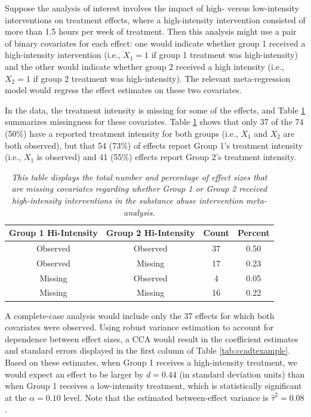 \documentclass[
]{article}
\begin{document}
Suppose the analysis of interest involves the impact of high- versus low-intensity interventions on treatment effects, where a high-intensity intervention consisted of more than 1.5 hours per week of treatment.
Then this analysis might use a pair of binary covariates for each effect: one would indicate whether group 1 received a high-intensity intervention (i.e., \(X_1 = 1\) if group 1 treatment was high-intensity) and the other would indicate whether group 2 received a high intensity (i.e., \(X_{2} = 1\) if group 2 treatment was high-intensity).
The relevant meta-regression model would regress the effect estimates on these two covariates.

In the data, the treatment intensity is missing for some of the effects, and Table \ref{tab:misspat} summarizes missingness for these covariates.
Table \ref{tab:misspat} shows that only 37 of the 74 (50\%) have a reported treatment intensity for both groups (i.e., \(X_{1}\) and \(X_{2}\) are both observed), but that 54 (73\%) of effects report Group 1's treatment intensity (i.e., \(X_{1}\) is observed) and 41 (55\%) effects report Group 2's treatment intensity.

\begin{table}

\caption{\label{tab:unnamed-chunk-2}\label{tab:misspat} \textit{This table displays the total number and percentage of effect sizes that are missing covariates regarding whether Group 1 or Group 2 received high-intensity interventions in the substance abuse intervention meta-analysis.}}
\centering
\begin{tabular}[t]{cccc}
\toprule
Group 1 Hi-Intensity & Group 2 Hi-Intensity & Count & Percent\\
\midrule
Observed & Observed & 37 & 0.50\\
Observed & Missing & 17 & 0.23\\
Missing & Observed & 4 & 0.05\\
Missing & Missing & 16 & 0.22\\
\bottomrule
\end{tabular}
\end{table}

A complete-case analysis would include only the 37 effects for which both covariates were observed.
Using robust variance estimation to account for dependence between effect sizes, a CCA would result in the coefficient estimates and standard errors displayed in the first column of Table \ref{tab:ccadtexample}.
Based on these estimates, when Group 1 receives a high-intensity treatment, we would expect an effect to be larger by \(d = 0.44\) (in standard deviation units) than when Group 1 receives a low-intensity treatment, which is statistically significant at the \(\alpha = 0.10\) level.
Note that the estimated between-effect variance is \(\hat{\tau}^2 = 0.08\).
\end{document}
